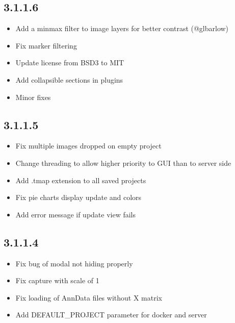 \documentclass[letterpaper,10pt,english,openany,oneside]{sphinxmanual}
\begin{document}
\subsection{3.1.1.6}
\label{\detokenize{docs/intro/versions:id10}}\begin{itemize}
\item {} 
\sphinxAtStartPar
Add a min\sphinxhyphen{}max filter to image layers for better contrast (@glbarlow)

\item {} 
\sphinxAtStartPar
Fix marker filtering

\item {} 
\sphinxAtStartPar
Update license from BSD\sphinxhyphen{}3 to MIT

\item {} 
\sphinxAtStartPar
Add collapsible sections in plugins

\item {} 
\sphinxAtStartPar
Minor fixes

\end{itemize}


\subsection{3.1.1.5}
\label{\detokenize{docs/intro/versions:id11}}\begin{itemize}
\item {} 
\sphinxAtStartPar
Fix multiple images dropped on empty project

\item {} 
\sphinxAtStartPar
Change threading to allow higher priority to GUI than to server side

\item {} 
\sphinxAtStartPar
Add .tmap extension to all saved projects

\item {} 
\sphinxAtStartPar
Fix pie charts display update and colors

\item {} 
\sphinxAtStartPar
Add error message if update view fails

\end{itemize}


\subsection{3.1.1.4}
\label{\detokenize{docs/intro/versions:id12}}\begin{itemize}
\item {} 
\sphinxAtStartPar
Fix bug of modal not hiding properly

\item {} 
\sphinxAtStartPar
Fix capture with scale of 1

\item {} 
\sphinxAtStartPar
Fix loading of AnnData files without X matrix

\item {} 
\sphinxAtStartPar
Add DEFAULT\_PROJECT parameter for docker and server

\end{itemize}
\end{document}
